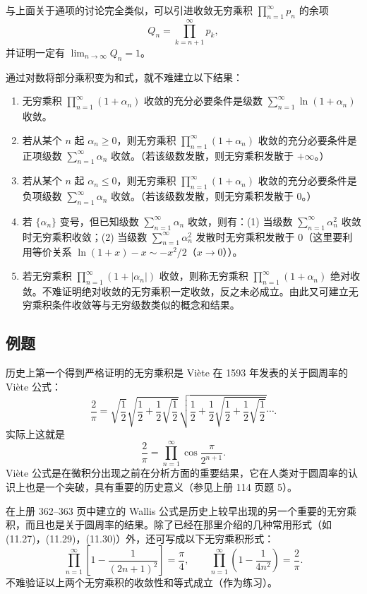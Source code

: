 与上面关于通项的讨论完全类似，可以引进收敛无穷乘积 $\prod_{n=1}^{\infty}p_n$ 的余项
\[
Q_n=\prod_{k=n+1}^{\infty}p_k,
\]
并证明一定有 $\lim_{n\to\infty}Q_n=1$。

通过对数将部分乘积变为和式，就不难建立以下结果：

\begin{enumerate}[label=\arabic*.]
\item 无穷乘积 $\prod_{n=1}^{\infty}(1+\alpha_n)$ 收敛的充分必要条件是级数 $\sum_{n=1}^{\infty}\ln(1+\alpha_n)$ 收敛。
\item 若从某个 $n$ 起 $\alpha_n\geq0$，则无穷乘积 $\prod_{n=1}^{\infty}(1+\alpha_n)$ 收敛的充分必要条件是正项级数 $\sum_{n=1}^{\infty}\alpha_n$ 收敛。（若该级数发散，则无穷乘积发散于 $+\infty$。）
\item 若从某个 $n$ 起 $\alpha_n\leq0$，则无穷乘积 $\prod_{n=1}^{\infty}(1+\alpha_n)$ 收敛的充分必要条件是负项级数 $\sum_{n=1}^{\infty}\alpha_n$ 收敛。（若该级数发散，则无穷乘积发散于 0。）
\item 若 $\{\alpha_n\}$ 变号，但已知级数 $\sum_{n=1}^{\infty}\alpha_n$ 收敛，则有：(1) 当级数 $\sum_{n=1}^{\infty}\alpha_n^2$ 收敛时无穷乘积收敛；(2) 当级数 $\sum_{n=1}^{\infty}\alpha_n^2$ 发散时无穷乘积发散于 0（这里要利用等价关系 $\ln(1+x)-x\sim-x^2/2$（$x\to0$））。
\item 若无穷乘积 $\prod_{n=1}^{\infty}(1+|\alpha_n|)$ 收敛，则称无穷乘积 $\prod_{n=1}^{\infty}(1+\alpha_n)$ 绝对收敛。不难证明绝对收敛的无穷乘积一定收敛，反之未必成立。由此又可建立无穷乘积条件收敛等与无穷级数类似的概念和结果。
\end{enumerate}

\subsection{例题}

历史上第一个得到严格证明的无穷乘积是 Viète 在 1593 年发表的关于圆周率的 Viète 公式：
\begin{equation}
\frac2\pi=\sqrt{\frac12}\sqrt{\frac12+\frac12\sqrt{\frac12}}\sqrt{\frac12+\frac12\sqrt{\frac12+\frac12\sqrt{\frac12}}}\cdots.
\tag{13.25}
\end{equation}
实际上这就是
\begin{equation}
\frac2\pi=\prod_{n=1}^{\infty}\cos\frac{\pi}{2^{n+1}}.
\tag{13.26}
\end{equation}
Viète 公式是在微积分出现之前在分析方面的重要结果，它在人类对于圆周率的认识上也是一个突破，具有重要的历史意义（参见上册 114 页题 5）。

在上册 362--363 页中建立的 Wallis 公式是历史上较早出现的另一个重要的无穷乘积，而且也是关于圆周率的结果。除了已经在那里介绍的几种常用形式（如 (11.27)，(11.29)，(11.30)）外，还可写成以下无穷乘积形式：
\begin{equation}
\prod_{n=1}^{\infty}\left[1-\frac1{(2n+1)^2}\right]=\frac\pi4,
\qquad
\prod_{n=1}^{\infty}\left(1-\frac1{4n^2}\right)=\frac2\pi.
\tag{13.27}
\end{equation}
不难验证以上两个无穷乘积的收敛性和等式成立（作为练习）。

